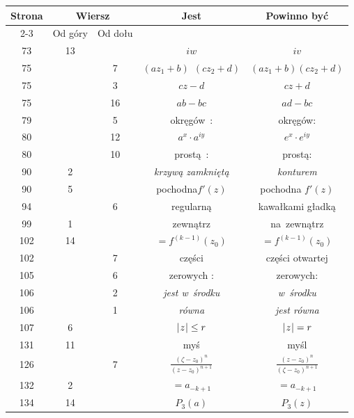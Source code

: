 \documentclass[a4paper,11pt]{article}
\numberwithin{equation}{section}
\begin{document}
\begin{center}
  \begin{tabular}{|c|c|c|c|c|}
    \hline
    Strona & \multicolumn{2}{c|}{Wiersz} & Jest
                              & Powinno być \\ \cline{2-3}
    & Od góry & Od dołu & & \\
    \hline
    73 & 13 & & $iw$ & $iv$ \\
    75 & & \hphantom{0}7 & $( a z_{ 1 } + b )\;\, ( c z_{ 2 } + d )$
           & $( a z_{ 1 } + b ) ( c z_{ 2 } + d )$ \\
    75 & & \hphantom{0}3 & $c z - d$ & $c z + d$ \\
    75 & & 16 & $ab - bc$ & $ad - bc$ \\
    79 & & \hphantom{0}5 & okręgów~: & okręgów: \\
    80 & & 12 & $a^{ x } \cdot a^{ iy }$ & $e^{ x } \cdot e^{ iy }$ \\
    80 & & 10 & prostą~: & prostą: \\
    90 & \hphantom{0}2 & & \textit{krzywą zamkniętą} & \textit{konturem} \\
    \hphantom{0}90 & \hphantom{0}5 & & pochodna$f'( z )$
    & pochodna $f'( z )$ \\
    \hphantom{0}94 & & \hphantom{0}6 & regularną & kawałkami gładką \\
    \hphantom{0}99 & \hphantom{0}1 & & zewnątrz & na~zewnątrz \\
    102 & 14 & & $=\!\! f^{ ( k - 1 ) }( z_{ 0 } )$
           & $= f^{ ( k - 1 ) }( z_{ 0 } )$ \\
    102 & & \hphantom{0}7 & części & części otwartej \\
    105 & & \hphantom{0}6 & zerowych : & zerowych: \\
    106 & & \hphantom{0}2 & \textit{jest w~środku} & \textit{w~środku} \\
    106 & & \hphantom{0}1 & \textit{równa} & \textit{jest równa} \\
    107 & \hphantom{0}6 & & $| \hspace{0.05em}  z  \hspace{0.05em} | \leq r$ & $| \hspace{0.05em}  z  \hspace{0.05em} | = r$ \\
    131 & 11 & & myś & myśl \\
    126 & & \hphantom{0}7 & $\frac{ ( \zeta - z_{ 0 } )^{ n } }{ ( z - z_{ 0 } )^{ n + 1 } }$
           & $\frac{ ( z - z_{ 0 } )^{ n } }{ ( \zeta - z_{ 0 } )^{ n + 1 } }$ \\
    132 & \hphantom{0}2 & & $=\!\! a_{ -k + 1 }$ & $= a_{ -k + 1 }$ \\
    134 & 14 & & $P_{ 3 }( a )$ & $P_{ 3 }( z )$ \\

\end{tabular}
\end{center}
\end{document}
